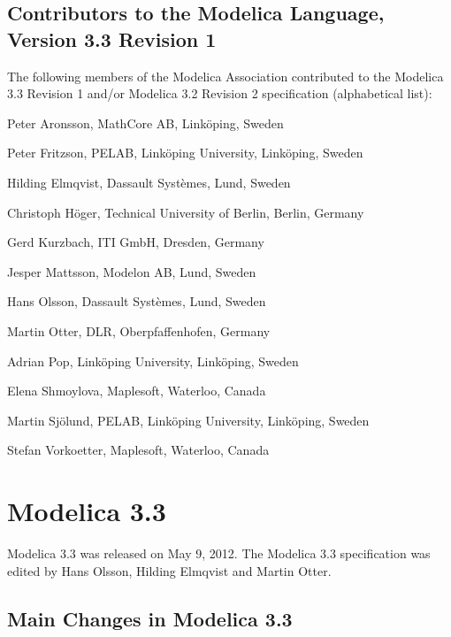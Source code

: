 \subsection{Contributors to the Modelica Language, Version 3.3 Revision 1}\label{contributors-to-the-modelica-language-version-3-3-revision-1}

The following members of the Modelica Association contributed to the
Modelica 3.3 Revision 1 and/or Modelica 3.2 Revision 2 specification
(alphabetical list):
\begin{contributors}
\item Peter Aronsson, MathCore AB, Linköping, Sweden
\item Peter Fritzson, PELAB, Linköping University, Linköping, Sweden
\item Hilding Elmqvist, Dassault Systèmes, Lund, Sweden
\item Christoph Höger, Technical University of Berlin, Berlin, Germany
\item Gerd Kurzbach, ITI GmbH, Dresden, Germany
\item Jesper Mattsson, Modelon AB, Lund, Sweden
\item Hans Olsson, Dassault Systèmes, Lund, Sweden
\item Martin Otter, DLR, Oberpfaffenhofen, Germany
\item Adrian Pop, Linköping University, Linköping, Sweden
\item Elena Shmoylova, Maplesoft, Waterloo, Canada
\item Martin Sjölund, PELAB, Linköping University, Linköping, Sweden
\item Stefan Vorkoetter, Maplesoft, Waterloo, Canada
\end{contributors}

\section{Modelica 3.3}\label{modelica-3-3}

Modelica 3.3 was released on May 9, 2012. The Modelica 3.3 specification
was edited by Hans Olsson, Hilding Elmqvist and Martin Otter.

\subsection{Main Changes in Modelica 3.3}\label{main-changes-in-modelica-3-3}

